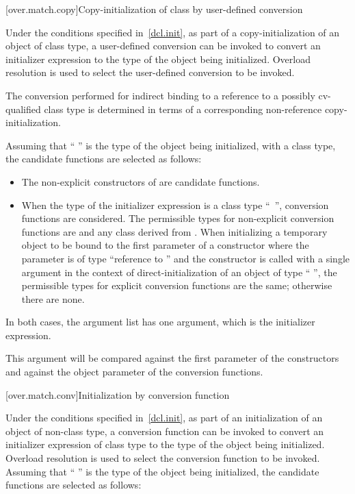 [over.match.copy]{Copy-initialization of class by user-defined conversion}%

\pnum
Under the conditions specified in~\ref{dcl.init}, as
part of a copy-initialization of an object of class type, a user-defined
conversion can be invoked to convert an initializer expression to the
type of the object being initialized.
Overload resolution is used
to select the user-defined conversion to be invoked.
\begin{note}
The conversion performed for indirect binding to a reference to a possibly
cv-qualified class type is determined in terms of a corresponding non-reference
copy-initialization.
\end{note}
Assuming that
`` '' is the type of the object being initialized, with
a class type,
the candidate functions are selected as follows:

\begin{itemize}
\item
The non-explicit constructors of
are candidate functions.
\item
When the type of the initializer expression is a class type
``\cv{}~'',
conversion functions are considered.
The permissible types for non-explicit conversion functions are
 and any class derived from .
When initializing a temporary object
to be bound to the first parameter of a constructor
where the parameter is of type
``reference to  ''
and the constructor is
called with a single argument in the context of
direct-initialization of an object of type `` '',
the permissible types for explicit conversion functions are the same;
otherwise there are none.
\end{itemize}

\pnum
In both cases, the argument list has one argument, which is the initializer
expression.
\begin{note}
This argument will be compared against
the first parameter of the constructors and against the
object parameter of the conversion functions.
\end{note}

[over.match.conv]{Initialization by conversion function}%

\pnum
Under the conditions specified in~\ref{dcl.init}, as
part of an initialization of an object of non-class type,
a conversion function can be invoked to convert an initializer
expression of class type to the type of the object
being initialized.
Overload resolution is used to select the
conversion function to be invoked.
Assuming that ``\cv{} '' is the
type of the object being initialized,
the candidate functions are selected as follows:

